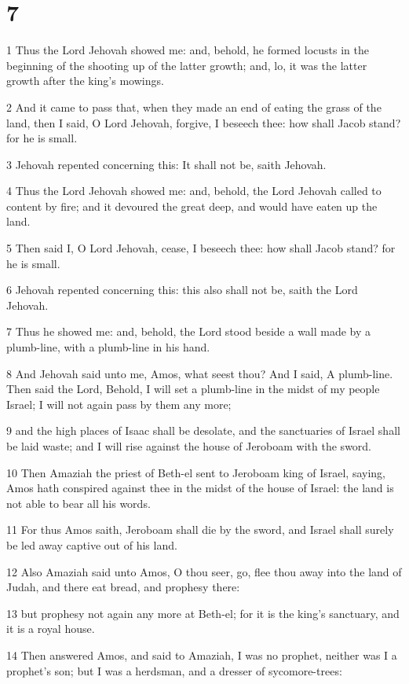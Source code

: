 \chapter{7}

\par 1 Thus the Lord Jehovah showed me: and, behold, he formed locusts in the beginning of the shooting up of the latter growth; and, lo, it was the latter growth after the king's mowings.
\par 2 And it came to pass that, when they made an end of eating the grass of the land, then I said, O Lord Jehovah, forgive, I beseech thee: how shall Jacob stand? for he is small.
\par 3 Jehovah repented concerning this: It shall not be, saith Jehovah.
\par 4 Thus the Lord Jehovah showed me: and, behold, the Lord Jehovah called to content by fire; and it devoured the great deep, and would have eaten up the land.
\par 5 Then said I, O Lord Jehovah, cease, I beseech thee: how shall Jacob stand? for he is small.
\par 6 Jehovah repented concerning this: this also shall not be, saith the Lord Jehovah.
\par 7 Thus he showed me: and, behold, the Lord stood beside a wall made by a plumb-line, with a plumb-line in his hand.
\par 8 And Jehovah said unto me, Amos, what seest thou? And I said, A plumb-line. Then said the Lord, Behold, I will set a plumb-line in the midst of my people Israel; I will not again pass by them any more;
\par 9 and the high places of Isaac shall be desolate, and the sanctuaries of Israel shall be laid waste; and I will rise against the house of Jeroboam with the sword.
\par 10 Then Amaziah the priest of Beth-el sent to Jeroboam king of Israel, saying, Amos hath conspired against thee in the midst of the house of Israel: the land is not able to bear all his words.
\par 11 For thus Amos saith, Jeroboam shall die by the sword, and Israel shall surely be led away captive out of his land.
\par 12 Also Amaziah said unto Amos, O thou seer, go, flee thou away into the land of Judah, and there eat bread, and prophesy there:
\par 13 but prophesy not again any more at Beth-el; for it is the king's sanctuary, and it is a royal house.
\par 14 Then answered Amos, and said to Amaziah, I was no prophet, neither was I a prophet's son; but I was a herdsman, and a dresser of sycomore-trees:
